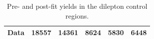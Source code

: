 \begin{table}[tp]
{\begin{tabular}{l
			r@{$\,\pm\,$}l
			r@{$\,\pm\,$}l
			r@{$\,\pm\,$}l
			r@{$\,\pm\,$}l
			r@{$\,\pm\,$}l
			r@{$\,\pm\,$}l
			r@{$\,\pm\,$}l
			r@{$\,\pm\,$}l
			r@{$\,\pm\,$}l
			r@{$\,\pm\,$}l
		}
\hline
Data   & \multicolumn{4}{c}{18557} & \multicolumn{4}{c}{14361} & \multicolumn{4}{c}{8624} & \multicolumn{4}{c}{5830} & \multicolumn{4}{c}{6448} \\ \hline
			\bottomrule
		\end{tabular}
		}
	\vspace*{0.2cm}
\caption{Pre- and post-fit yields in the dilepton control regions. }
\label{tab:yields_dilep_cr}
\end{table}
